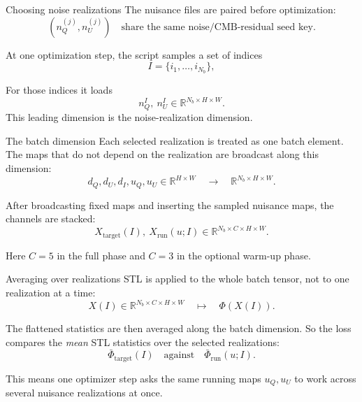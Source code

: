 \documentclass[aspectratio=169,11pt]{beamer}
\begin{document}
\begin{frame}[fragile]{Choosing noise realizations}
The nuisance files are paired before optimization:
\[
  (n_Q^{(j)},n_U^{(j)})\quad\text{share the same noise/CMB-residual seed key.}
\]

\vspace{0.25em}
At one optimization step, the script samples a set of indices
\[
  I=\{i_1,\ldots,i_{N_b}\},
\]

\vspace{0.25em}
For those indices it loads
\[
  n_Q^I,\ n_U^I\in\mathbb{R}^{N_b\times H\times W}.
\]
This leading dimension is the noise-realization dimension.
\end{frame}

\begin{frame}[fragile]{The batch dimension}
Each selected realization is treated as one batch element.
The maps that do not depend on the realization are broadcast along this dimension:
\[
  d_Q,d_U,d_I,u_Q,u_U\in\mathbb{R}^{H\times W}
  \quad\longrightarrow\quad
  \mathbb{R}^{N_b\times H\times W}.
\]

\vspace{0.25em}
After broadcasting fixed maps and inserting the sampled nuisance maps,
the channels are stacked:
\[
  X_{\mathrm{target}}(I),\ X_{\mathrm{run}}(u;I)
  \in\mathbb{R}^{N_b\times C\times H\times W}.
\]

\vspace{0.25em}
Here $C=5$ in the full phase and $C=3$ in the optional warm-up phase.
\end{frame}

\begin{frame}[fragile]{Averaging over realizations}
STL is applied to the whole batch tensor, not to one realization at a time:
\[
  X(I)\in\mathbb{R}^{N_b\times C\times H\times W}
  \quad\longmapsto\quad
  \Phi(X(I)).
\]

\vspace{0.25em}
The flattened statistics are then averaged along the batch dimension.
So the loss compares the \emph{mean} STL statistics over the selected realizations:
\[
  \bar\Phi_{\mathrm{target}}(I)
  \quad\text{against}\quad
  \bar\Phi_{\mathrm{run}}(u;I).
\]

\vspace{0.25em}
This means one optimizer step asks the same running maps $u_Q,u_U$ to work across several nuisance realizations at once.
\end{frame}
\end{document}
